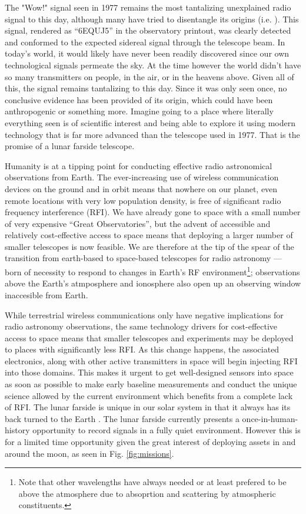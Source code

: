 The "Wow!" signal seen in 1977 \citep{wow} remains the most tantalizing unexplained radio signal to this day, although many have tried to disentangle its origins (i.e. \citealt{Wow_2024}).  This signal, rendered as ``6EQUJ5'' in the observatory printout, was clearly detected and conformed to the expected sidereal signal through the telescope beam.  In today's world, it would likely have never been readily discovered since our own technological signals permeate the sky. At the time however the world didn't have so many transmitters on people, in the air, or in the heavens above.  Given all of this, the signal remains tantalizing to this day. Since it was only seen once, no conclusive evidence has been provided of its origin, which could have been anthropogenic or something more. Imagine going to a place where literally everything seen is of scientific interest and being able to explore it using modern technology that is far more advanced than the telescope used in 1977.   That is the promise of a lunar farside telescope.

Humanity is at a tipping point for conducting effective radio astronomical observations from Earth. The ever-increasing use of wireless communication devices on the ground and in orbit means that nowhere on our planet, even remote locations with very low population density, is free of significant radio frequency interference (RFI). We have already gone to space with a small number of very expensive ``Great Observatories'', but the advent of accessible and relatively cost-effective access to space means that deploying a larger number of smaller telescopes is now feasible. We are therefore at the tip of the spear of the transition from earth-based to space-based telescopes for radio astronomy --- born of necessity to respond to changes in Earth’s RF environment\footnote{Note that other wavelengths have always needed or at least prefered to be above the atmosphere due to absoprtion and scattering by atmospheric constituents.}; observations above the Earth's atmposphere and ionosphere also open up an observing window inaccesible from Earth.

While terrestrial wireless communications only have negative implications for radio astronomy observations, the same technology drivers for cost-effective access to space means that smaller telescopes and experiments may be deployed to places with significantly less RFI. As this change happens, the associated electronics, along with other active transmitters in space will begin injecting RFI into those domains. This makes it urgent to get well-designed sensors into space as soon as possible to make early baseline measurements and conduct the unique science allowed by the current environment which benefits from a complete lack of RFI. The lunar farside is unique in our solar system in that it always has its back turned to the Earth \citep{MACCONE2019233,michaud2020lunar,heidmann2002}. The lunar farside currently presents a once-in-human-history opportunity to record signals in a fully quiet environment. However this is for a limited time opportunity given the great interest of deploying assets in and around the moon, as seen in Fig. \ref{fig:missions}.

